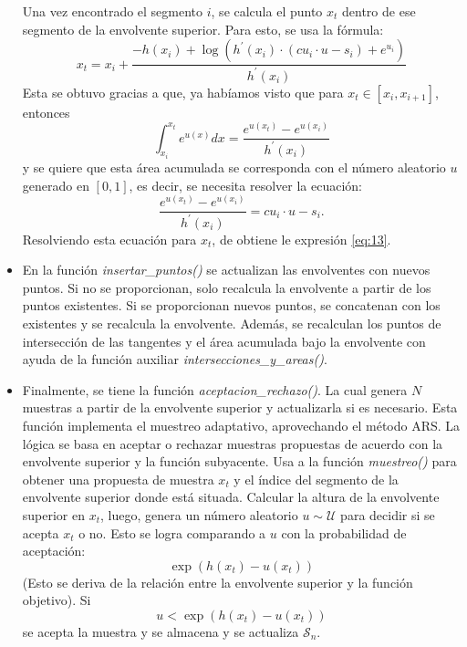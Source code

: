 \begin{itemize}
Una vez encontrado el segmento $i$, se calcula el punto  $x_t$  dentro de ese segmento de la envolvente superior. Para esto, se usa la fórmula:
\begin{equation} \label{eq:13}
	x_t = x_i + \frac{-h(x_i) + \log \left( h^{'}(x_i) \cdot \left( cu_i \cdot u - s_i \right) + e^{u_i} \right)}{h^{'}(x_i)}
\end{equation}
Esta se obtuvo gracias a que, ya habíamos visto que para $x_t\in[x_{i}, x_{i+1}]$, entonces
\begin{equation*}
	\int_{x_{i}}^{x_t} e^{u(x)} dx =  \frac{e^{u(x_t)} - e^{u(x_{i})}}{h^{'}(x_{i})}
\end{equation*}
y se quiere que esta área acumulada se corresponda con el número aleatorio $u$ generado en $[0, 1]$, es decir, se necesita resolver la ecuación:
\begin{equation*}
	\frac{e^{u(x_t)} - e^{u(x_{i})}}{h^{'}(x_{i})} = cu_i \cdot u - s_i.
\end{equation*}
Resolviendo esta ecuación para $x_t$, de obtiene le expresión \eqref{eq:13}.

\item En la función \textit{insertar\_puntos()} se actualizan las envolventes con nuevos puntos. Si no se proporcionan, solo recalcula la envolvente a partir de los puntos existentes. Si se proporcionan nuevos puntos, se concatenan con los existentes y se recalcula la envolvente. Además, se recalculan los puntos de intersección de las tangentes y el área acumulada bajo la
envolvente con ayuda de la función auxiliar \textit{intersecciones\_y\_areas()}.

\item Finalmente, se tiene la función \textit{aceptacion\_rechazo()}. La cual genera $N$  muestras a partir de la envolvente superior y actualizarla si es necesario. Esta función implementa el muestreo adaptativo, aprovechando el método ARS. La lógica se basa en aceptar o rechazar muestras propuestas de acuerdo con la envolvente superior y la función subyacente. Usa a la función \textit{muestreo()} para obtener una propuesta de muestra  $x_t$  y el índice del segmento de la envolvente superior donde está situada. Calcular la altura de la envolvente superior en  $x_t$, luego, genera un número aleatorio $u\sim\mathcal{U}$ para decidir si se acepta $x_t$ o no. Esto se logra comparando a $u$ con la probabilidad de aceptación:
\begin{equation} \label{eq:14}
	\exp{\left(h(x_t)-u(x_t)\right)}
\end{equation}
(Esto se deriva de la relación entre la envolvente superior y la función objetivo). Si
\begin{equation} \label{eq:15}
	u <	\exp{\left(h(x_t)-u(x_t)\right)}
\end{equation}
se acepta la muestra y se almacena y se actualiza $\mathcal{S}_n$.
\end{itemize}

